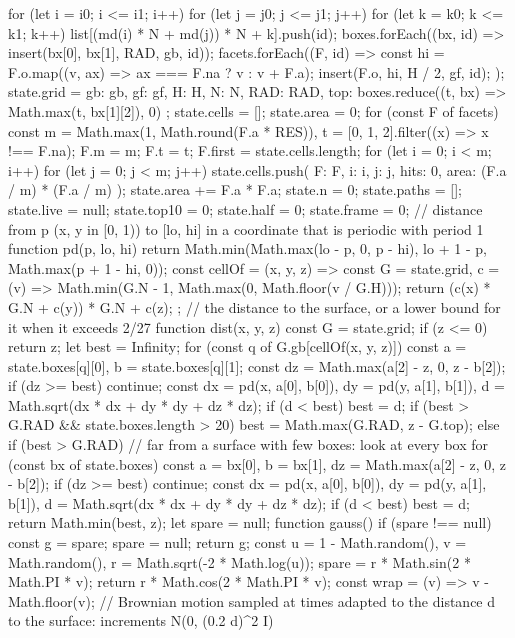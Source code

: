 \begin{js}
{{    for (let i = i0; i <= i1; i++) for (let j = j0; j <= j1; j++) for (let k = k0; k <= k1; k++) list[(md(i) * N + md(j)) * N + k].push(id);
  }
  boxes.forEach((bx, id) => insert(bx[0], bx[1], RAD, gb, id));
  facets.forEach((F, id) => { const hi = F.o.map((v, ax) => ax === F.na ? v : v + F.a); insert(F.o, hi, H / 2, gf, id); });
  state.grid = { gb: gb, gf: gf, H: H, N: N, RAD: RAD, top: boxes.reduce((t, bx) => Math.max(t, bx[1][2]), 0) };
  state.cells = []; state.area = 0;
  for (const F of facets) {
    const m = Math.max(1, Math.round(F.a * RES)), t = [0, 1, 2].filter((x) => x !== F.na);
    F.m = m; F.t = t; F.first = state.cells.length;
    for (let i = 0; i < m; i++) for (let j = 0; j < m; j++) state.cells.push({ F: F, i: i, j: j, hits: 0, area: (F.a / m) * (F.a / m) });
    state.area += F.a * F.a;
  }
  state.n = 0; state.paths = []; state.live = null; state.top10 = 0; state.half = 0; state.frame = 0;
}
// distance from p (x, y in [0, 1)) to [lo, hi] in a coordinate that is periodic with period 1
function pd(p, lo, hi) { return Math.min(Math.max(lo - p, 0, p - hi), lo + 1 - p, Math.max(p + 1 - hi, 0)); }
const cellOf = (x, y, z) => { const G = state.grid, c = (v) => Math.min(G.N - 1, Math.max(0, Math.floor(v / G.H))); return (c(x) * G.N + c(y)) * G.N + c(z); };
// the distance to the surface, or a lower bound for it when it exceeds 2/27
function dist(x, y, z) {
  const G = state.grid; if (z <= 0) return z;
  let best = Infinity;
  for (const q of G.gb[cellOf(x, y, z)]) {
    const a = state.boxes[q][0], b = state.boxes[q][1];
    const dz = Math.max(a[2] - z, 0, z - b[2]); if (dz >= best) continue;
    const dx = pd(x, a[0], b[0]), dy = pd(y, a[1], b[1]), d = Math.sqrt(dx * dx + dy * dy + dz * dz);
    if (d < best) best = d;
  }
  if (best > G.RAD && state.boxes.length > 20) best = Math.max(G.RAD, z - G.top);
  else if (best > G.RAD) {
    // far from a surface with few boxes: look at every box
    for (const bx of state.boxes) {
      const a = bx[0], b = bx[1], dz = Math.max(a[2] - z, 0, z - b[2]); if (dz >= best) continue;
      const dx = pd(x, a[0], b[0]), dy = pd(y, a[1], b[1]), d = Math.sqrt(dx * dx + dy * dy + dz * dz);
      if (d < best) best = d;
    }
  }
  return Math.min(best, z);
}
let spare = null;
function gauss() {
  if (spare !== null) { const g = spare; spare = null; return g; }
  const u = 1 - Math.random(), v = Math.random(), r = Math.sqrt(-2 * Math.log(u));
  spare = r * Math.sin(2 * Math.PI * v); return r * Math.cos(2 * Math.PI * v);
}
const wrap = (v) => v - Math.floor(v);
// Brownian motion sampled at times adapted to the distance d to the surface: increments N(0, (0.2 d)^2 I)

\end{js}
